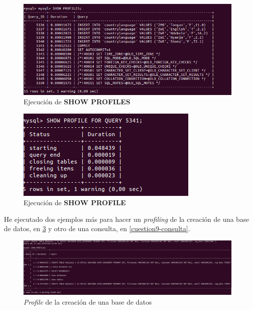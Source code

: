 \begin{figure}[H]
	\centering
	\includegraphics[scale=0.6]{cuestion9-showprofiles.png}
	\caption{Ejecución de \textbf{SHOW PROFILES}} \label{cuestion9-showprofiles}
\end{figure}

\begin{figure}[H]
	\centering
	\includegraphics[scale=0.6]{cuestion9-showprofilecommit.png}
	\caption{Ejecución de \textbf{SHOW PROFILE}} \label{cuestion9-showprofile}
\end{figure}

He ejecutado dos ejemplos más para hacer un \textit{profiling} de la creación de una base de datos, en \ref{cuestion9-creacionbdprofiles} y otro de una consulta, en \ref{cuestion9-consulta}.

\begin{figure}[H]
	\centering
	\includegraphics[scale=0.35]{cuestion9-creaciondbprofiles.png}
	\caption{\textit{Profile} de la creación de una base de datos} \label{cuestion9-creacionbdprofiles}
\end{figure}

